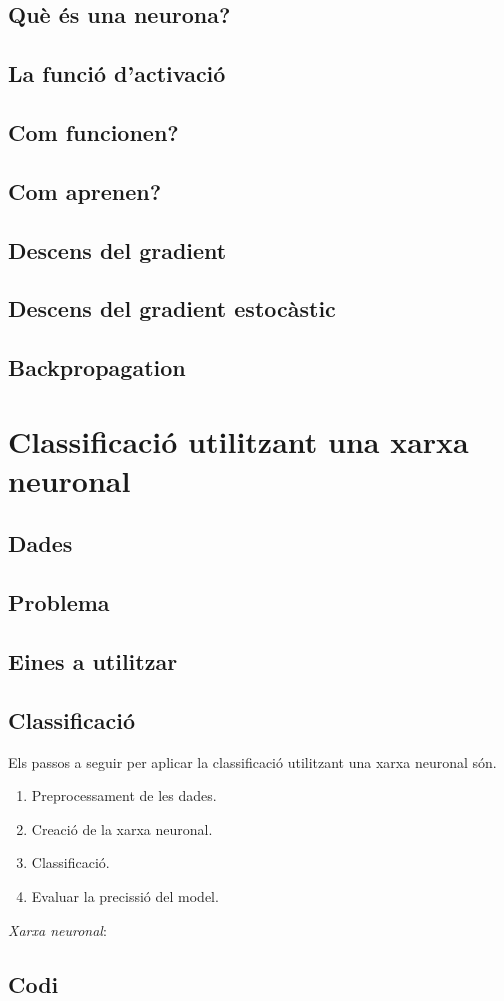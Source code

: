 \documentclass[12pt]{article}
\begin{document}
\subsection{Què és una neurona?}
\subsection{La funció d'activació}
\subsection{Com funcionen?}
\subsection{Com aprenen?}
\subsection{Descens del gradient}
\subsection{Descens del gradient estocàstic}
\subsection{Backpropagation}

\clearpage
\section{Classificació utilitzant una xarxa neuronal}
\subsection{Dades}
\subsection{Problema}
\subsection{Eines a utilitzar}
\subsection{Classificació}
Els passos a seguir per aplicar la classificació utilitzant una xarxa neuronal són.
\begin{enumerate}
	\item Preprocessament de les dades.
	\item Creació de la xarxa neuronal.
	\item Classificació.
	\item Evaluar la precissió del model.
\end{enumerate}

\clearpage
\begin{thebibliography}{9}
	\textit{Xarxa neuronal}:
  	\\
\end{thebibliography}

\clearpage
\begin{appendices}
\section{Codi}
\end{appendices}
\end{document}
